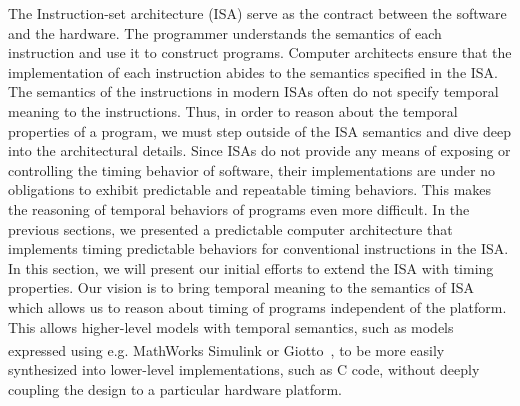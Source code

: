 
The Instruction-set architecture (ISA) serve as the contract between the software and the hardware.
The programmer understands the semantics of each instruction and use it to construct programs.
Computer architects ensure that the implementation of each instruction abides to the semantics specified in the ISA.
The semantics of the instructions in modern ISAs often do not specify temporal meaning to the instructions.   
Thus, in order to reason about the temporal properties of a program, we must step outside of the ISA semantics and dive deep into the architectural details.
Since ISAs do not provide any means of exposing or controlling the timing behavior of software, their implementations are under no obligations to exhibit predictable and repeatable timing behaviors.
This makes the reasoning of temporal behaviors of programs even more difficult.  
In the previous sections, we presented a predictable computer architecture that implements timing predictable behaviors for conventional instructions in the ISA. 
In this section, we will present our initial efforts to extend the ISA with timing properties.  
Our vision is to bring temporal meaning to the semantics of ISA which allows us to reason about timing of programs independent of the platform.
This allows higher-level models with temporal semantics, such as models expressed using e.g. MathWorks Simulink\textsuperscript{\textregistered} or Giotto~\cite{henzinger_giotto}, to be more easily synthesized into lower-level implementations, such as C code, without deeply coupling the design to a particular hardware platform. 

